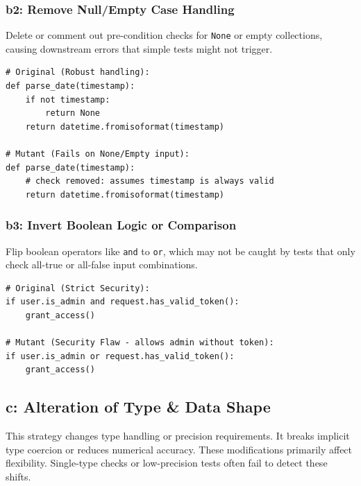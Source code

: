 \documentclass[11pt]{article}
\begin{document}
\subsubsection*{b2: Remove Null/Empty Case Handling}
Delete or comment out pre-condition checks for \texttt{None} or empty collections, causing downstream errors that simple tests might not trigger.

\begin{listing}[H]
\begin{verbatim}
# Original (Robust handling):
def parse_date(timestamp):
    if not timestamp:
        return None
    return datetime.fromisoformat(timestamp)

# Mutant (Fails on None/Empty input):
def parse_date(timestamp):
    # check removed: assumes timestamp is always valid
    return datetime.fromisoformat(timestamp)
\end{verbatim}
\caption{b2: Removing safety guards for null inputs}
\label{code:B2}
\end{listing}

\subsubsection*{b3: Invert Boolean Logic or Comparison}
Flip boolean operators like \texttt{and} to \texttt{or}, which may not be caught by tests that only check all-true or all-false input combinations.

\begin{listing}[H]
\begin{verbatim}
# Original (Strict Security):
if user.is_admin and request.has_valid_token():
    grant_access()

# Mutant (Security Flaw - allows admin without token):
if user.is_admin or request.has_valid_token():
    grant_access()
\end{verbatim}
\caption{b3: Weakening boolean logic in security checks}
\label{code:b3}
\end{listing}

\subsection*{c: Alteration of Type \& Data Shape}
This strategy changes type handling or precision requirements. It breaks implicit type coercion or reduces numerical accuracy. These modifications primarily affect flexibility. Single-type checks or low-precision tests often fail to detect these shifts.
\end{document}
